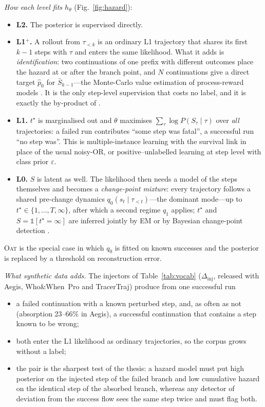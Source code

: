 \documentclass[10pt,a4paper]{article}
\begin{document}
\emph{How each level fits $h_\theta$} (Fig.~\ref{fig:hazard}):
\begin{itemize}[leftmargin=1.1em]
\item \textbf{L2.} The posterior is supervised directly.
\item \textbf{L1$^{+}$.} A rollout from $\tau_{<k}$ is an ordinary L1 trajectory that shares its first $k-1$ steps with $\tau$ and enters the same likelihood. What it adds is \emph{identification}: two continuations of one prefix with different outcomes place the hazard at or after the branch point, and $N$ continuations give a direct target $\hat p_0$ for $\bar S_{k-1}$---the Monte-Carlo value estimation of process-reward models \cite{wang2024mathshepherd}. It is the only step-level supervision that costs no label, and it is exactly the by-product of .
\item \textbf{L1.} $t^\star$ is marginalised out and $\theta$ maximises $\sum_\tau\log P(S_\tau\mid\tau)$ over \emph{all} trajectories: a failed run contributes ``some step was fatal'', a successful run ``no step was''. This is multiple-instance learning \cite{dietterich1997mil} with the survival link in place of the usual noisy-OR, or positive--unlabelled learning at step level \cite{elkan2008pu,kiryo2017nnpu} with class prior $\varepsilon$.
\item \textbf{L0.} $S$ is latent as well. The likelihood then needs a model of the steps themselves and becomes a \emph{change-point mixture}: every trajectory follows a shared pre-change dynamics $q_0(s_t\mid\tau_{<t})$---the dominant mode---up to $t^\star\in\{1,\dots,T,\infty\}$, after which a second regime $q_1$ applies; $t^\star$ and $S=\mathbb{1}[t^\star{=}\infty]$ are inferred jointly by EM or by Bayesian change-point detection \cite{adams2007bocpd}.
\end{itemize}
\textsc{Oat} is the special case in which $q_0$ is fitted on known successes and the posterior is replaced by a threshold on reconstruction error.

\emph{What synthetic data adds.} The injectors of Table~\ref{tab:vocab} ($\Delta_{\mathrm{inj}}$, released with Aegis, Who\&When~Pro and TracerTraj) produce from one successful run
\begin{itemize}[leftmargin=1.1em]
\item a failed continuation with a known perturbed step, and, as often as not (absorption 23--66\% in Aegis), a successful continuation that contains a step known to be wrong;
\item both enter the L1 likelihood as ordinary trajectories, so the corpus grows without a label;
\item the pair is the sharpest test of the thesis: a hazard model must put high posterior on the injected step of the failed branch and low cumulative hazard on the identical step of the absorbed branch, whereas any detector of deviation from the success flow sees the same step twice and must flag both.
\end{itemize}
\end{document}
